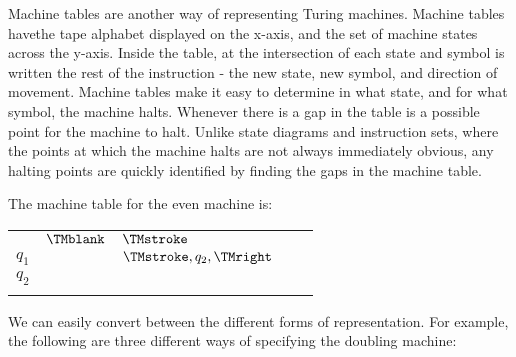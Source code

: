 \documentclass[../../include/open-logic-section]{subfiles}
\begin{document}
\begin{explain}
Machine tables are another way of representing Turing machines. Machine
tables havethe tape alphabet displayed on the x-axis, and the set of machine
states across the y-axis. Inside the table, at the intersection of each state
 and symbol is written the rest of the instruction - the new state, new symbol,
 and direction of movement. Machine tables make it easy to determine in what 
 state, and for what symbol, the machine halts. Whenever
there is a gap in the table is a possible point for the machine to halt. Unlike
state diagrams and instruction sets, where the points at which the machine halts
are not always immediately obvious, any halting points are quickly identified by 
finding the gaps in the machine table.
\end{explain}

\begin{ex}
The machine table for the even machine is:
\centering
\begin{tabular}{lllll}
           & $\TMblank$ & $\TMstroke$ &  &  \\
$q_1$ &  & $\TMstroke, q_2, \TMright$         &  &  \\
$q_2$ &            &             &  &  \\
     &            &             &  & 
\end{tabular}
\end{ex}

\begin{ex}
We can easily convert between the different forms of representation.
For example, the following are three different ways of specifying the
doubling machine:
\end{ex}
\end{document}

